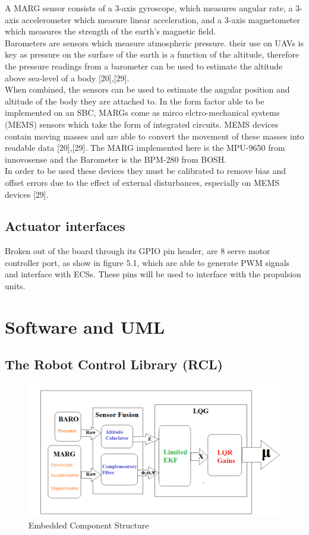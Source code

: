 \documentclass[12pt,a4paper,twoside]{report}
\begin{document}
				A MARG sensor consists of a 3-axis gyroscope, which measures angular rate, a 3-axis accelerometer which measure linear acceleration, and a 3-axis magnetometer which measures the strength of the earth's magnetic field. 
				\\
				Barometers are sensors which measure atmospheric pressure. their use on UAVs is key as pressure on the surface of the earth is a function of the altitude, therefore the pressure readings from a barometer can be used to estimate the altitude above sea-level of a body [20],[29].
				\\
				When combined, the sensors can be used to estimate the angular position and altitude of the body they are attached to. In the form factor able to be implemented on an SBC, MARGs come as mirco elctro-mechanical systems (MEMS) sensors which take the form of integrated circuits. MEMS devices contain moving masses and are able to convert the movement of these masses into readable data [20],[29]. The MARG implemented here is the MPU-9650 from innovosense and the Barometer is the BPM-280 from BOSH.
				\\
				In order to be used these devices they must be calibrated to remove bias and offset errors due to the effect of external disturbances, especially on MEMS devices [29]. 
				
			\subsection{Actuator interfaces}
			
				Broken out of the board through its GPIO pin header, are 8 serve motor controller port, as show in figure 5.1, which are able to generate PWM signals and interface with ECSs. These pins will be used to interface with the propulsion units.
				
		\section{Software and UML}
		
			\subsection{The Robot Control Library (RCL)}
			
				\begin{figure}[h!]
					\centering
					\includegraphics[width=1\linewidth]{ImplementationStructure.png}
					\caption{Embedded Component Structure}
					\label{fig:embeddedcomponentstructure}
				\end{figure}
			
\end{document}
